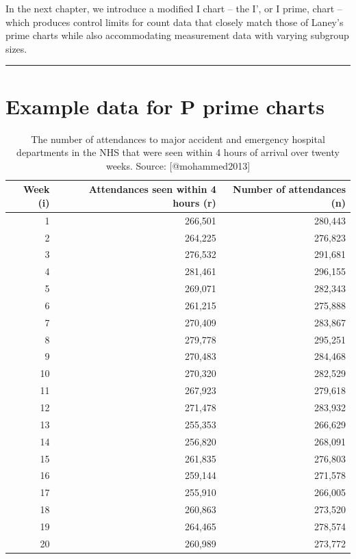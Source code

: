 \documentclass[
]{book}
\begin{document}
In the next chapter, we introduce a modified I chart -- the I', or I prime, chart -- which produces control limits for count data that closely match those of Laney's prime charts while also accommodating measurement data with varying subgroup sizes.

\begin{center}\rule{0.5\linewidth}{0.5pt}\end{center}

\section*{Example data for P prime charts}\label{pp-data}

\begin{table}

\caption{\label{tab:pcharts-tab1}The number of attendances to major accident and emergency hospital departments in the NHS that were seen within 4 hours of arrival over twenty weeks. Source: [@mohammed2013]}
\centering
\begin{tabular}[t]{r|r|r}
\hline
Week (i) & Attendances seen within 4 hours (r) & Number of attendances (n)\\
\hline
1 & 266,501 & 280,443\\
\hline
2 & 264,225 & 276,823\\
\hline
3 & 276,532 & 291,681\\
\hline
4 & 281,461 & 296,155\\
\hline
5 & 269,071 & 282,343\\
\hline
6 & 261,215 & 275,888\\
\hline
7 & 270,409 & 283,867\\
\hline
8 & 279,778 & 295,251\\
\hline
9 & 270,483 & 284,468\\
\hline
10 & 270,320 & 282,529\\
\hline
11 & 267,923 & 279,618\\
\hline
12 & 271,478 & 283,932\\
\hline
13 & 255,353 & 266,629\\
\hline
14 & 256,820 & 268,091\\
\hline
15 & 261,835 & 276,803\\
\hline
16 & 259,144 & 271,578\\
\hline
17 & 255,910 & 266,005\\
\hline
18 & 260,863 & 273,520\\
\hline
19 & 264,465 & 278,574\\
\hline
20 & 260,989 & 273,772\\
\hline
\end{tabular}
\end{table}
\end{document}
